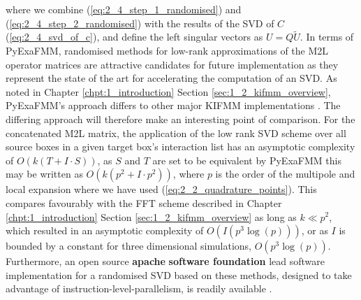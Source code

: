 where we combine (\ref{eq:2_4_step_1_randomised}) and (\ref{eq:2_4_step_2_randomised})
with the results of the \gls{SVD} of $C$ (\ref{eq:2_4_svd_of_c}), and define the
left singular vectors as $U = Q \tilde{U}$. In terms of \gls{PyExaFMM}, randomised
methods for low-rank approximations of the M2L operator matrices are attractive candidates
for future implementation as they represent the state of the art for accelerating the computation of an \gls{SVD}.
As noted in Chapter \ref{chpt:1_introduction} Section \ref{sec:1_2_kifmm_overview},
\gls{PyExaFMM}'s approach differs to other major \gls{KIFMM} implementations \cite{Malhotra:2015:CCP,exafmm}.
The differing approach will therefore make an interesting point of comparison.
For the concatenated \gls{M2L} matrix, the application of the low rank \gls{SVD}
scheme over all source boxes in a given target box's interaction list has
an asymptotic complexity of $O(k(T + I \cdot S))$, as $S$ and $T$ are set to be
equivalent by \gls{PyExaFMM} this may be written as $O(k(p^2 + I \cdot p^2))$, where
$p$ is the order of the multipole and local expansion where we have used
(\ref{eq:2_2_quadrature_points}). This compares favourably with the \gls{FFT} scheme described in Chapter
\ref{chpt:1_introduction} Section \ref{sec:1_2_kifmm_overview} as long as $k \ll p^2$,
which resulted in an asymptotic complexity of $O(I(p^3 \log(p)))$, or as $I$ is
bounded by a constant for three dimensional simulations, $O(p^3\log(p))$. Furthermore,
an open source \textbf{\gls{apache}} \textbf{software foundation} lead software implementation for
a randomised \gls{SVD} based on these methods, designed to take advantage
of \gls{instruction-level-parallelism}, is readily available \cite{mahout}.
